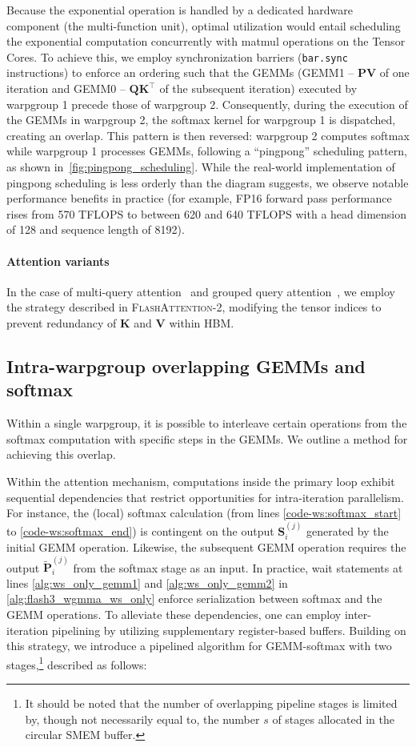 Because the exponential operation is handled by a dedicated hardware component (the multi-function unit), optimal utilization would entail scheduling the exponential computation concurrently with matmul operations on the Tensor Cores. To achieve this, we employ synchronization barriers (\texttt{bar.sync} instructions) to enforce an ordering such that the GEMMs (GEMM1 -- $\mathbf{P} \mathbf{V}$ of one iteration and GEMM0 -- $\mathbf{Q} \mathbf{K}^\top$ of the subsequent iteration) executed by warpgroup 1 precede those of warpgroup 2. Consequently, during the execution of the GEMMs in warpgroup 2, the softmax kernel for warpgroup 1 is dispatched, creating an overlap. This pattern is then reversed: warpgroup 2 computes softmax while warpgroup 1 processes GEMMs, following a ``pingpong'' scheduling pattern, as shown in~\cref{fig:pingpong_scheduling}. While the real-world implementation of pingpong scheduling is less orderly than the diagram suggests, we observe notable performance benefits in practice (for example, FP16 forward pass performance rises from 570 TFLOPS to between 620 and 640 TFLOPS with a head dimension of 128 and sequence length of 8192).

\paragraph{Attention variants} In the case of multi-query attention~\citep{shazeer2019fast} and grouped query attention~\citep{ainslie2023gqa}, we employ the strategy described in \textsc{FlashAttention-2}, modifying the tensor indices to prevent redundancy of $\mathbf{K}$ and $\mathbf{V}$ within HBM.

\subsection{Intra-warpgroup overlapping GEMMs and softmax}

Within a single warpgroup, it is possible to interleave certain operations from the softmax computation with specific steps in the GEMMs. We outline a method for achieving this overlap.

Within the attention mechanism, computations inside the primary loop exhibit sequential dependencies that restrict opportunities for intra-iteration parallelism. For instance, the (local) softmax calculation (from lines \ref{code-ws:softmax_start} to \ref{code-ws:softmax_end}) is contingent on the output $\mathbf{S}_i^{(j)}$ generated by the initial GEMM operation. Likewise, the subsequent GEMM operation requires the output $\widetilde{\mathbf{P}}_i^{(j)}$ from the softmax stage as an input. In practice, wait statements at lines \ref{alg:ws_only_gemm1} and \ref{alg:ws_only_gemm2} in \cref{alg:flash3_wgmma_ws_only} enforce serialization between softmax and the GEMM operations. To alleviate these dependencies, one can employ inter-iteration pipelining by utilizing supplementary register-based buffers. Building on this strategy, we introduce a pipelined algorithm for GEMM-softmax with two stages,\footnote{It should be noted that the number of overlapping pipeline stages is limited by, though not necessarily equal to, the number $s$ of stages allocated in the circular SMEM buffer.} described as follows:

